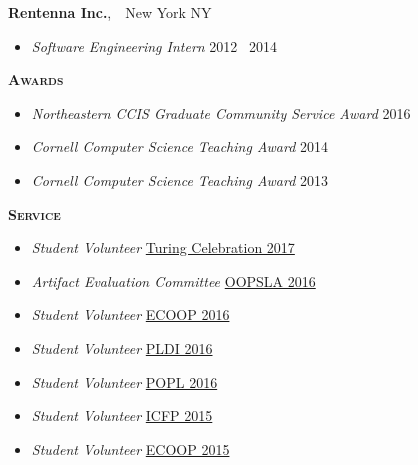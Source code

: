\documentclass{article}
\newcommand{\mysection}[1]{\vspace{0.5cm}
\hspace{-1.3cm}\textsc{\textbf{#1}}~\hrulefill}
\newcommand{\mysubsection}[1]{\hspace{-0.7cm}\textbf{#1}}
\begin{document}
\mysubsection{Rentenna Inc.},~~New York NY
\begin{itemize}
\item \emph{Software Engineering Intern} \hfill 2012 \textendash\ 2014
\end{itemize}

\newpage
\mysection{Awards} %
\begin{itemize}
\item \emph{Northeastern CCIS Graduate Community Service Award} \hfill 2016
\item \emph{Cornell Computer Science Teaching Award} \hfill 2014
\item \emph{Cornell Computer Science Teaching Award} \hfill 2013
\end{itemize}



\mysection{Service}
\begin{itemize}
\item \emph{Student Volunteer} \hfill \href{https://www.acm.org/turing-award-50/conference}{Turing Celebration 2017}
\item \emph{Artifact Evaluation Committee} \hfill \href{http://2016.splashcon.org/track/splash-2016-artifacts}{OOPSLA 2016}
\item \emph{Student Volunteer} \hfill \href{http://2016.ecoop.org/}{ECOOP 2016}
\item \emph{Student Volunteer} \hfill \href{http://conf.researchr.org/home/PLDI-2016}{PLDI 2016}
\item \emph{Student Volunteer} \hfill \href{http://conf.researchr.org/home/POPL-2016}{POPL 2016}
\item \emph{Student Volunteer} \hfill \href{http://icfpconference.org/icfp2015/}{ICFP 2015}
\item \emph{Student Volunteer} \hfill \href{http://2015.ecoop.org/}{ECOOP 2015}
\end{itemize}
\end{document}
